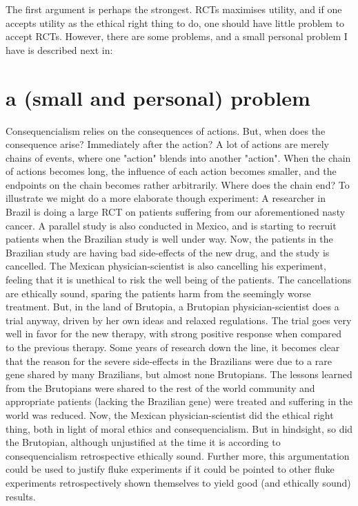 \documentclass[12p]{article}
\begin{document}
The first argument is perhaps the strongest.
RCTs maximises utility, and if one accepts utility as the ethical right thing to do, one should have little problem to accept RCTs.
However, there are some problems, and a small personal problem I have is described next in:

\section*{a (small and personal) problem}

Consequencialism relies on the consequences of actions.
But, when does the consequence arise?
Immediately after the action?
A lot of actions are merely chains of events, where one "action" blends into another "action".
When the chain of actions becomes long, the influence of each action becomes smaller, and the endpoints on the chain becomes rather arbitrarily.
Where does the chain end?
To illustrate we might do a more elaborate though experiment:
A researcher in Brazil is doing a large RCT on patients suffering from our aforementioned nasty cancer.
A parallel study is also conducted in Mexico, and is starting to recruit patients when the Brazilian study is well under way.
Now, the patients in the Brazilian study are having bad side-effects of the new drug, and the study is cancelled.
The Mexican physician-scientist is also cancelling his experiment, feeling that it is unethical to risk the well being of the patients.
The cancellations are ethically sound, sparing the patients harm from the seemingly worse treatment.
But, in the land of  Brutopia, a Brutopian physician-scientist does a trial anyway, driven by her own ideas and relaxed regulations.
The trial goes very well in favor for the new therapy, with strong positive response when compared to the previous therapy.
Some years of research down the line, it becomes clear that the reason for the severe side-effects in the Brazilians were due to a rare gene shared by many Brazilians, but almost none Brutopians.
The lessons learned from the Brutopians were shared to the rest of the world community and appropriate patients (lacking the Brazilian gene) were treated and suffering in the world was reduced.
Now, the Mexican physician-scientist did the ethical right thing, both in light of moral ethics and consequencialism.
But in hindsight, so did the Brutopian, although unjustified at the time it is according to consequencialism retrospective ethically sound.
Further more, this argumentation could be used to justify fluke experiments if it could be pointed to other fluke experiments retrospectively shown themselves to yield good (and ethically sound) results.
\end{document}
